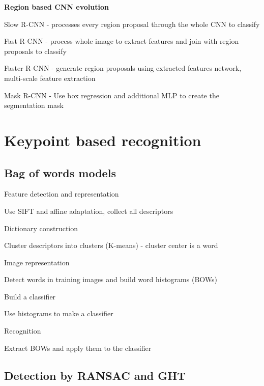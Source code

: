 \documentclass{article}
\begin{document}
\begin{multicols*}{2}
{	\textbf{Region based CNN evolution}
	\begin{compactitem}
		\item Slow R-CNN - processes every region proposal through the whole CNN to classify
		\item Fast R-CNN - process whole image to extract features and join with region proposals to classify
		\item Faster R-CNN - generate region proposals using extracted features network, multi-scale feature extraction
		\item Mask R-CNN - Use box regression and additional MLP to create the segmentation mask
	\end{compactitem}


	\section{Keypoint based recognition}

	\subsection{Bag of words models}

	\begin{compactenum}
		\item Feature detection and representation

		Use SIFT and affine adaptation, collect all descriptors

		\item Dictionary construction

		Cluster descriptors into clusters (K-means) - cluster center is a word

		\item Image representation

		Detect words in training images and build word histograms (BOWs)

		\item Build a classifier

		Use histograms to make a classifier

		\item Recognition

		Extract BOWs and apply them to the classifier
	\end{compactenum}

	\subsection{Detection by RANSAC and GHT}

}
\end{multicols*}
\end{document}
